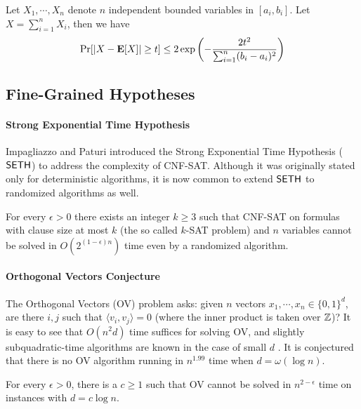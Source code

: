 \begin{theorem}\label{thm:hoeffding}
Let $X_1, \cdots, X_n$ denote $n$ independent bounded variables in $[a_i,b_i]$. Let $X= \sum_{i=1}^n X_i$, then we have
\begin{align*}
\Pr[ | X - \mathbf{E}[X] | \geq t ] \leq 2\exp \left( - \frac{2t^2}{ \sum_{i=1}^n (b_i - a_i)^2 } \right)
\end{align*}
\end{theorem}


\subsection{Fine-Grained Hypotheses}\label{sec:fine_grained}
\paragraph*{Strong Exponential Time Hypothesis}

Impagliazzo and Paturi \cite{ip01} introduced the Strong Exponential Time Hypothesis ($\mathsf{SETH}$) to address the complexity of CNF-SAT. Although it was originally stated only for deterministic algorithms, it is now common to extend $\mathsf{SETH}$ to randomized algorithms as well.

\begin{hypothesis}
For every $\epsilon > 0$ there exists an integer $k \geq 3$ such that CNF-SAT on formulas with clause size at most $k$ (the so called $k$-SAT problem) and $n$ variables cannot be solved in $O(2^{(1-\epsilon)n})$ time even by a randomized algorithm.
\end{hypothesis}

\paragraph*{Orthogonal Vectors Conjecture}

The Orthogonal Vectors (OV) problem asks: given $n$ vectors $x_1, \cdots, x_n \in \{0,1\}^d$, are there $i,j$ such that $\langle v_i, v_j \rangle = 0$ (where the inner product is taken over ${\mathbb Z}$)? It is easy to see that $O(n^2 d)$ time suffices for solving OV, and slightly subquadratic-time algorithms are known in the case of small $d$ \cite{awy15,cw16}. It is conjectured that there is no OV algorithm running in $n^{1.99}$ time when $d = \omega (\log n)$.

\begin{conjecture}
For every $\epsilon > 0$, there is a $c \geq 1$ such that OV cannot be solved in $n^{2-\epsilon}$ time on instances with $d = c \log n$.
\end{conjecture}

